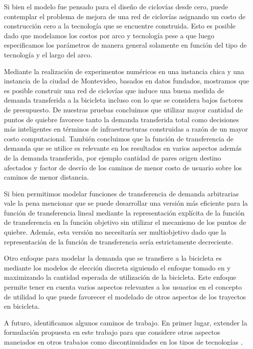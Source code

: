 Si bien el modelo fue pensado para el diseño de ciclovías desde cero, puede contemplar el problema de mejora de una red de ciclovías asignando un costo de construcción cero a la tecnología que se encuentre construida. Esto es posible dado que modelamos los costos por arco y tecnología pese a que luego especificamos los parámetros de manera general solamente en función del tipo de tecnología y el largo del arco.

Mediante la realización de experimentos numéricos en una instancia chica y una instancia de la ciudad de Montevideo, basados en datos fundados, mostramos que es posible construir una red de ciclovías que induce una buena medida de demanda transferida a la bicicleta incluso con lo que se considera bajos factores de presupuesto. De nuestras pruebas concluimos que utilizar mayor cantidad de puntos de quiebre favorece tanto la demanda transferida total como decisiones más inteligentes en términos de infraestructuras construidas a razón de un mayor costo computacional. También concluimos que la función de transferencia de demanda que se utilice es relevante en los resultados en varios aspectos además de la demanda transferida, por ejemplo cantidad de pares origen destino afectados y factor de desvío de los caminos de menor costo de usuario sobre los caminos de menor distancia.

Si bien permitimos modelar funciones de transferencia de demanda arbitrarias vale la pena mencionar que se puede desarrollar una versión más eficiente para la función de transferencia lineal mediante la representación explícita de la función de transferencia en la función objetivo sin utilizar el mecanismo de los puntos de quiebre. Además, esta versión no necesitaría ser multiobjetivo dado que la representación de la función de transferencia sería estrictamente decreciente.

Otro enfoque para modelar la demanda que se transfiere a la bicicleta es mediante los modelos de elección discreta siguiendo el enfoque tomado en \textcite{Pacheco2021} y maximizando la cantidad esperada de utilización de la bicicleta. Este enfoque permite tener en cuenta varios aspectos relevantes a los usuarios en el concepto de utilidad lo que puede favorecer el modelado de otros aspectos de los trayectos en bicicleta.

A futuro, identificamos algunos caminos de trabajo. En primer lugar, extender la formulación propuesta en este trabajo para que considere otros aspectos manejados en otros trabajos como discontinuidades en los tipos de tecnologías \parencite{baya2021}, integrar el concepto de camino seguro de manera que la demanda entre un origen y un destino pueda potencialmente ser satisfecha si existe una ciclovía que los une \parencite{Duthie2014}, y permitir distinguir qué tipos de tecnologías se puede construir en cada arco de la red, aspecto que puede ser necesario para contemplar las diferentes realidades dentro de una ciudad.

